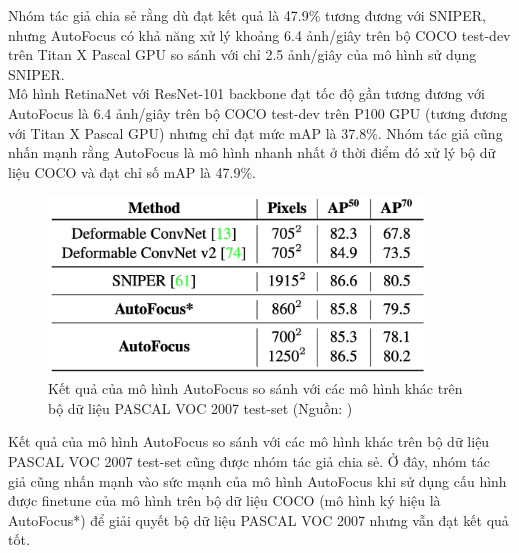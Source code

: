 {    \noindent
    Nhóm tác giả chia sẻ rằng dù đạt kết quả là 47.9\% tương đương với SNIPER, nhưng AutoFocus có khả năng xử lý khoảng 6.4 ảnh/giây trên bộ COCO test-dev trên Titan X Pascal GPU so sánh với chỉ 2.5 ảnh/giây của mô hình sử dụng SNIPER. \\
    Mô hình RetinaNet với ResNet-101 backbone đạt tốc độ gần tương đương với AutoFocus là 6.4 ảnh/giây trên bộ COCO test-dev trên P100 GPU (tương đương với Titan X Pascal GPU) nhưng chỉ đạt mức mAP là 37.8\%.
    Nhóm tác giả cũng nhấn mạnh rằng AutoFocus là mô hình nhanh nhất ở thời điểm đó xử lý bộ dữ liệu COCO và đạt chỉ số mAP là 47.9\%.

    \begin{figure}[H]
        \centering
        \includegraphics[width=10cm] {images/autofocus_results_2}
        \caption{Kết quả của mô hình AutoFocus so sánh với các mô hình khác trên bộ dữ liệu PASCAL VOC 2007 test-set (Nguồn: \cite{najibi2019autofocus})}
        \label{fig:autofocus_results_2}
    \end{figure}

    \noindent
    Kết quả của mô hình AutoFocus so sánh với các mô hình khác trên bộ dữ liệu PASCAL VOC 2007 test-set cũng được nhóm tác giả chia sẻ.
    Ở đây, nhóm tác giả cũng nhấn mạnh vào sức mạnh của mô hình AutoFocus khi sử dụng cấu hình được finetune của mô hình trên bộ dữ liệu COCO (mô hình ký hiệu là AutoFocus*) để giải quyết bộ dữ liệu PASCAL VOC 2007 nhưng vẫn đạt kết quả tốt.

}
